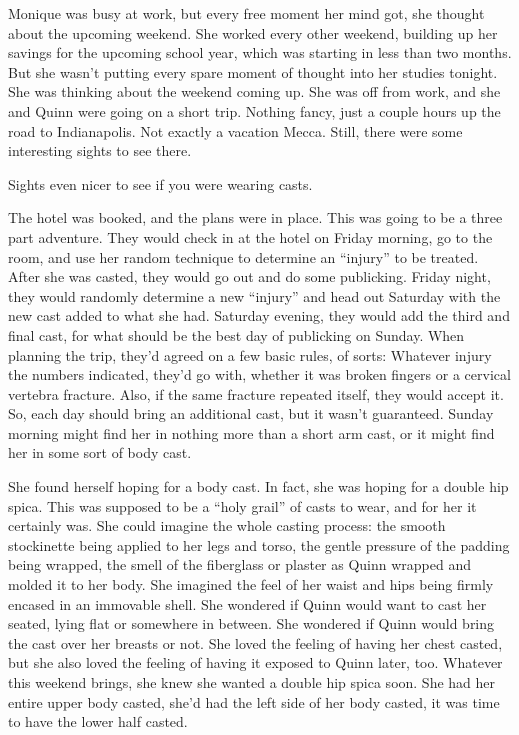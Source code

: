 \begin{thought}
Monique was busy at work, but every free moment her mind got, she thought about the
upcoming weekend. She worked every other weekend, building up her savings for the upcoming
school year, which was starting in less than two months. But she wasn't putting every spare
moment of thought into her studies tonight. She was thinking about the weekend coming up. She
was off from work, and she and Quinn were going on a short trip. Nothing fancy, just a couple
hours up the road to Indianapolis. Not exactly a vacation Mecca. Still, there were some
interesting sights to see there.

Sights even nicer to see if you were wearing casts.

The hotel was booked, and the plans were in place. This was going to be a three part
adventure. They would check in at the hotel on Friday morning, go to the room, and use her
random technique to determine an ``injury'' to be treated. After she was casted, they would go
out
and do some publicking. Friday night, they would randomly determine a new ``injury'' and head
out
Saturday with the new cast added to what she had. Saturday evening, they would add the third and
final cast, for what should be the best day of publicking on Sunday. When planning the trip,
they'd agreed on a few basic rules, of sorts: Whatever injury the numbers indicated, they'd go
with, whether it was broken fingers or a cervical vertebra fracture. Also, if the same fracture
repeated itself, they would accept it. So, each day should bring an additional cast, but it
wasn't guaranteed. Sunday morning might find her in nothing more than a short arm cast, or it
might find her in some sort of body cast.

She found herself hoping for a body cast. In fact, she was hoping for a double hip spica.
This was supposed to be a ``holy grail'' of casts to wear, and for her it certainly was. She
could
imagine the whole casting process: the smooth stockinette being applied to her legs and torso,
the gentle pressure of the padding being wrapped, the smell of the fiberglass or plaster as
Quinn wrapped and molded it to her body. She imagined the feel of her waist and hips being
firmly encased in an immovable shell. She wondered if Quinn would want to cast her seated, lying
flat or somewhere in between. She wondered if Quinn would bring the cast over her breasts or
not. She loved the feeling of having her chest casted, but she also loved the feeling of having
it exposed to Quinn later, too. Whatever this weekend brings, she knew she wanted a double hip
spica soon. She had her entire upper body casted, she'd had the left side of her body casted, it
was time to have the lower half casted.
\end{thought}

